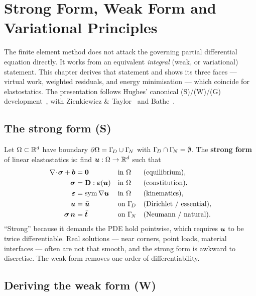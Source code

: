 \chapter{Strong Form, Weak Form and Variational Principles}
\label{ch:strong-weak}

The finite element method does not attack the governing partial
differential equation directly. It works from an equivalent
\emph{integral} (weak, or variational) statement. This chapter derives
that statement and shows its three faces --- virtual work, weighted
residuals, and energy minimisation --- which coincide for
elastostatics. The presentation follows Hughes' canonical
(S)/(W)/(G) development~\citep{hughes2000}, with Zienkiewicz \&
Taylor~\citep{zienkiewicz2013} and Bathe~\citep{bathe2014}.

\section{The strong form (S)}

Let $\Omega\subset\mathbb R^d$ have boundary
$\partial\Omega=\Gamma_{\!D}\cup\Gamma_{\!N}$ with $\Gamma_{\!D}\cap\Gamma_{\!N}=\emptyset$. The
\textbf{strong form} of linear elastostatics is: find
$\bm{u}:\Omega\to\mathbb R^d$ such that
\begin{subequations}\label{eq:strong}
\begin{align}
  \nabla\!\cdot\!\bm{\sigma} + \bm{b} &= \bm{0} && \text{in }\Omega
    &&\text{(equilibrium)},\\
  \bm{\sigma} &= \mathbf{D}:\bm{\varepsilon}(\bm{u}) && \text{in }\Omega
    &&\text{(constitution)},\\
  \bm{\varepsilon} &= \operatorname{sym}\nabla\bm{u} && \text{in }\Omega
    &&\text{(kinematics)},\\
  \bm{u} &= \bar{\bm{u}} && \text{on }\Gamma_{\!D}
    &&\text{(Dirichlet / essential)},\\
  \bm{\sigma}\,\bm{n} &= \bar{\bm{t}} && \text{on }\Gamma_{\!N}
    &&\text{(Neumann / natural)}.
\end{align}
\end{subequations}
``Strong'' because it demands the PDE hold pointwise, which requires
$\bm{u}$ to be twice differentiable. Real solutions --- near corners,
point loads, material interfaces --- often are not that smooth, and the
strong form is awkward to discretise. The weak form removes one order of
differentiability.

\section{Deriving the weak form (W)}

